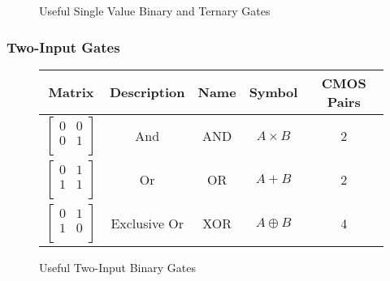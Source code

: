 \documentclass[12pt]{article}
\begin{document}
\begin{figure}[h]
\begin{tabular}{c|c|c|c|c}
    \end{tabular}
    \caption{Useful Single Value Binary and Ternary Gates}
    \label{fig:single_value_tern_gates}
\end{figure}

\subsubsection{Two-Input Gates}

\begin{figure}[h]
    \centering
    \begin{tabular}{c|c|c|c|c}
        Matrix & Description & Name & Symbol & CMOS Pairs \\
        \hline
        $\begin{bmatrix}0 & 0 \\ 0 & 1 \\\end{bmatrix}$ & And & AND & $A \times B$ & 2 \\
        $\begin{bmatrix}0 & 1 \\ 1 & 1 \\\end{bmatrix}$ & Or & OR & $A + B$ & 2 \\
        $\begin{bmatrix}0 & 1 \\ 1 & 0 \\\end{bmatrix}$ & Exclusive Or & XOR & $A \oplus B$ & 4 \\
    \end{tabular}
    \caption{Useful Two-Input Binary Gates}
    \label{fig:two_value_bin_gates}
\end{figure}
\end{document}
